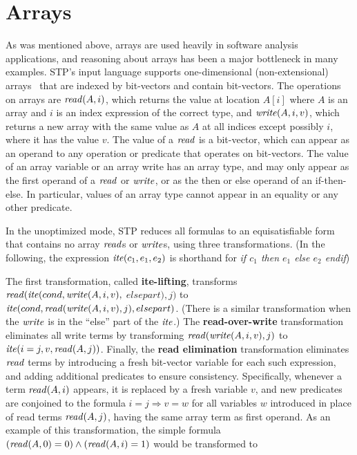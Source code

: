 \section{Arrays}
As was mentioned above, arrays are used heavily in software analysis
applications, and reasoning about arrays has been a major bottleneck
in many examples. STP's input language supports one-dimensional
(non-extensional) arrays~\cite{stumparray} that are indexed by
bit-vectors and contain bit-vectors.  The operations on arrays are
${\it read}(A, i)$, which returns the value at location $A[i]$ where $A$
is an array and $i$ is an index expression of the correct type, and
${\it write}(A, i, v)$, which returns a new array with the same value as
$A$ at all indices except possibly $i$, where it has the value $v$.
The value of a ${\it read}$ is a bit-vector, which can appear as an
operand to any operation or predicate that operates on bit-vectors.
The value of an array variable or an array write has an array type,
and may only appear as the first operand of a ${\it read}$ or
${\it write}$, or as the then or else operand of an if-then-else.  In
particular, values of an array type cannot appear in an equality or
any other predicate.




In the unoptimized mode, STP reduces all formulas to an
equisatisfiable form that contains no array ${\it read}$s or
${\it write}$s, using three transformations.  (In the following, the
expression ${\it ite}(c_1,e_1,e_2)$ is shorthand for {\it if $c_1$ then
$e_1$ else $e_2$ endif})

The first transformation, called {\bf ite-lifting}, transforms
${\it read}({\it ite}(cond, {\it write}(A, i, v),$ $elsepart), j)$ to
${\it ite}(cond, {\it read}({\it write}(A, i, v), j), elsepart)$.  (There is
a similar transformation when the ${\it write}$ is in the ``else'' part
of the ${\it ite}$.)  The {\bf read-over-write} transformation
eliminates all write terms by transforming ${\it read}({\it write}(A, i,
v), j)$ to ${\it ite}(i=j, v, {\it read}(A, j))$.  Finally, the {\bf read
elimination} transformation eliminates ${\it read}$ terms by introducing
a fresh bit-vector variable for each such expression, and adding
additional predicates to ensure consistency.  Specifically, whenever a
term ${\it read}(A, i)$ appears, it is replaced by a fresh variable $v$,
and new predicates are conjoined to the formula $i = j \Rightarrow v =
w$ for all variables $w$ introduced in place of read terms
${\it read}(A, j)$, having the same array term as first operand. As an
example of this transformation, the simple formula $({\it read}(A, 0) =
0) \wedge ({\it read}(A, i) = 1)$ would be transformed to


